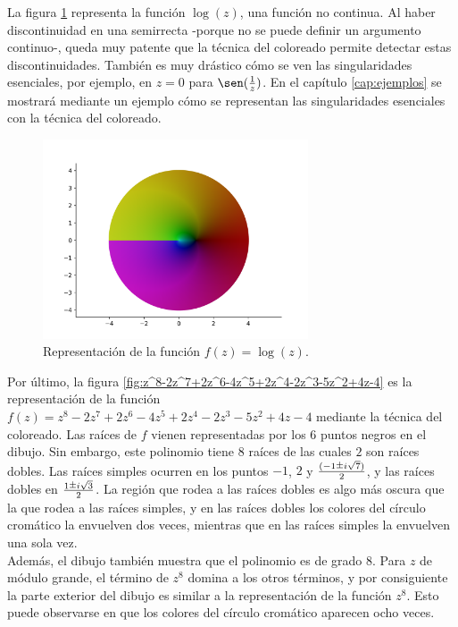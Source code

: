 La figura \ref{fig:log(z)} representa la función $\log(z)$, una función no continua. Al haber discontinuidad en una semirrecta -porque no se puede definir un argumento continuo-, queda muy patente que la técnica del coloreado permite detectar estas discontinuidades. También es muy drástico cómo se ven las singularidades esenciales, por ejemplo, en $z = 0$ para $\sen(\frac{1}{z})$. En el capítulo \ref{cap:ejemplos} se mostrará mediante un ejemplo cómo se representan las singularidades esenciales con la técnica del coloreado. \\

\begin{figure}[!htbp]
    \centering
    \includegraphics[width=0.7\textwidth]{../Aplicacion/log(z).png}
    \caption{Representación de la función $f(z) = \log(z)$.}
    \label{fig:log(z)}
\end{figure}

Por último, la figura \ref{fig:z^8-2z^7+2z^6-4z^5+2z^4-2z^3-5z^2+4z-4} es la representación de la función $f(z) = z^8-2z^7+2z^6-4z^5+2z^4-2z^3-5z^2+4z-4$ mediante la técnica del coloreado. Las raíces de $f$ vienen representadas por los $6$ puntos negros en el dibujo. Sin embargo, este polinomio tiene $8$ raíces de las cuales $2$ son raíces dobles. Las raíces simples ocurren en los puntos $-1$, $2$ y $\frac{(-1 \rpm i \sqrt{7})}{2}$, y las raíces dobles en $\frac{1 \rpm i \sqrt{3}}{2}$.  La región que rodea a las raíces dobles es algo más oscura que la que rodea a las raíces simples, y en las raíces dobles los colores del círculo cromático la envuelven dos veces, mientras que en las raíces simples la envuelven una sola vez. \\

Además, el dibujo también muestra que el polinomio es de grado $8$. Para $z$ de módulo grande, el término de $z^8$ domina a los otros términos, y por consiguiente la parte exterior del dibujo es similar a la representación de la función $z^8$. Esto puede observarse en que los colores del círculo cromático aparecen ocho veces. \\

